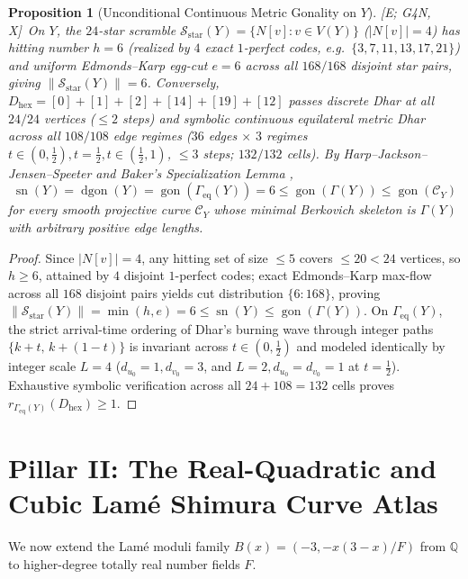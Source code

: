 \documentclass[11pt]{amsart}
\numberwithin{equation}{section}
\theoremstyle{plain}
\newtheorem{proposition}[theorem]{Proposition}
\theoremstyle{definition}\newtheorem{definition}[theorem]{Definition}
\theoremstyle{remark}\newtheorem{remark}[theorem]{Remark}
\newcommand{\Q}{\mathbb{Q}}
\newcommand{\calC}{\mathcal{C}}
\newcommand{\calS}{\mathcal{S}}
\newcommand{\gon}{\operatorname{gon}}
\newcommand{\dgon}{\operatorname{dgon}}
\newcommand{\sn}{\operatorname{sn}}
\newcommand{\ctag}[1]{\textup{\textsf{\scriptsize[#1]}}}
\begin{document}
\begin{proposition}[Unconditional Continuous Metric Gonality on $Y$]\label{prop:nauru_gonality}
\ctag{E; G4N, X}\ On $Y$, the $24$-star scramble $\calS_{\mathrm{star}}(Y) = \{N[v] : v\in V(Y)\}$ ($|N[v]|=4$) has hitting number $h=6$ (realized by $4$ exact $1$-perfect codes, e.g.\ $\{3,7,11,13,17,21\}$) and uniform Edmonds--Karp egg-cut $e=6$ across all $168/168$ disjoint star pairs, giving $\|\calS_{\mathrm{star}}(Y)\| = 6$. Conversely, $D_{\mathrm{hex}} = [0]+[1]+[2]+[14]+[19]+[12]$ passes discrete Dhar at all $24/24$ vertices ($\le 2$ steps) and symbolic continuous equilateral metric Dhar across all $108/108$ edge regimes ($36$ edges $\times$ $3$ regimes $t\in(0,\tfrac{1}{2}), t=\tfrac{1}{2}, t\in(\tfrac{1}{2},1)$, $\le 3$ steps; $132/132$ cells). By Harp--Jackson--Jensen--Speeter \cite{hjjs2022} and Baker's Specialization Lemma \cite{baker2008,bpr2013},
\begin{equation}\label{eq:nauru_gon_collapse}
\sn(Y) = \dgon(Y) = \gon(\Gamma_{\mathrm{eq}}(Y)) = 6 \le \gon(\Gamma(Y)) \le \gon(\calC_Y)
\end{equation}
for every smooth projective curve $\calC_Y$ whose minimal Berkovich skeleton is $\Gamma(Y)$ with arbitrary positive edge lengths.
\end{proposition}
\begin{proof}
Since $|N[v]|=4$, any hitting set of size $\le 5$ covers $\le 20 < 24$ vertices, so $h\ge 6$, attained by $4$ disjoint $1$-perfect codes; exact Edmonds--Karp max-flow \cite{edmondskarp1972} across all $168$ disjoint pairs yields cut distribution $\{6:168\}$, proving $\|\calS_{\mathrm{star}}(Y)\| = \min(h,e) = 6 \le \sn(Y) \le \gon(\Gamma(Y))$. On $\Gamma_{\mathrm{eq}}(Y)$, the strict arrival-time ordering of Dhar's burning wave \cite{dhar1990} through integer paths $\{k+t,\,k+(1-t)\}$ is invariant across $t\in(0,\frac{1}{2})$ and modeled identically by integer scale $L=4$ ($d_{u_0}=1, d_{v_0}=3$, and $L=2, d_{u_0}=d_{v_0}=1$ at $t=\frac{1}{2}$). Exhaustive symbolic verification across all $24+108=132$ cells proves $r_{\Gamma_{\mathrm{eq}}(Y)}(D_{\mathrm{hex}}) \ge 1$.
\end{proof}

\section{Pillar II: The Real-Quadratic and Cubic Lam\'e Shimura Curve Atlas}\label{sec:pillar2}
We now extend the Lam\'e moduli family $B(x) = (-3, -x(3-x)/F)$ from $\Q$ to higher-degree totally real number fields $F$.
\end{document}
